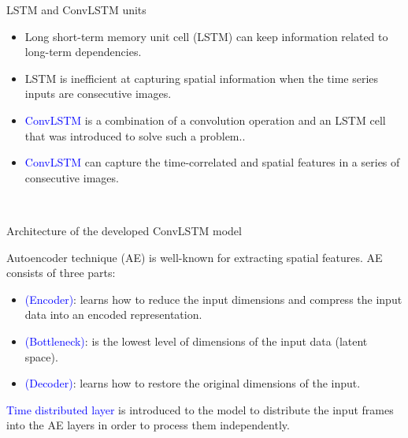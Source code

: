 \documentclass[10pt,aspectratio=169]{beamer} %
\begin{document}
\begin{frame}{LSTM and ConvLSTM units}
	\begin{minipage}[l]{0.55\textwidth}
		\begin{itemize}[<alert@+>]
			\item Long short-term memory unit cell (LSTM) can keep information related to long-term dependencies. 
			\item LSTM is inefficient at capturing spatial information when the time series inputs are consecutive images.
			\item \textcolor{blue}{ConvLSTM} is a combination of a convolution operation and an LSTM cell that was introduced to solve such a problem.. 
			\item \textcolor{blue}{ConvLSTM} can capture the time-correlated and spatial features in a series of consecutive images.
		\end{itemize}
	\end{minipage}
	\begin{minipage}[l]{0.4\textwidth}
		\begin{figure}
			\centering
			 \\
		\end{figure}
	\end{minipage}
\end{frame}

\setcounter{subfigure}{0}
\begin{frame}{Architecture of the developed ConvLSTM model}
	\begin{minipage}[l]{0.6\textwidth}
		Autoencoder technique (AE) is well-known for extracting spatial features.
		AE consists of three parts: 
		\begin{itemize}
			\item \textcolor{blue}{(Encoder)}: learns how to reduce the input dimensions and compress the input data into an encoded representation.
			\item \textcolor{blue}{(Bottleneck)}: is the lowest level of dimensions
			of the input data (latent space).
			\item \textcolor{blue}{(Decoder)}: learns how to restore the original dimensions of the input.		
		\end{itemize}
	 \textcolor{blue}{Time distributed layer}
	 is introduced to the model to distribute the input frames into the AE layers in order to process them independently.
 	\end{minipage}
	\begin{minipage}[l]{0.35\textwidth}
		\begin{figure}
		\end{figure}
	\end{minipage}
\end{frame}
\end{document}
